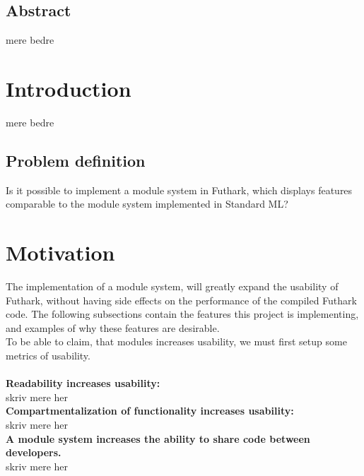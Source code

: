 \subsection{Abstract}
\label{subsec:abstract}
mere bedre

\section{Introduction}
\label{sec:introduction}
mere bedre

\subsection{Problem definition}
\label{subsec:probdef}
Is it possible to implement a module system in Futhark, which displays features
comparable to the module system implemented in Standard ML? \cite{sml modules}

\pagebreak
\section{Motivation}
\label{subsec:label}
The implementation of a module system, will greatly expand the usability of
Futhark, without having side effects on the performance of the compiled Futhark code.
The following subsections contain the features this project is implementing, and
examples of why these features are desirable.\\

To be able to claim, that modules increases usability, we must first
setup some metrics of usability.
\\
\\
\textbf{Readability increases usability:}\\
skriv mere her\\
\textbf{Compartmentalization of functionality increases usability:}\\
skriv mere her\\
\textbf{A module system increases the ability to share code between developers.}\\
skriv mere her

